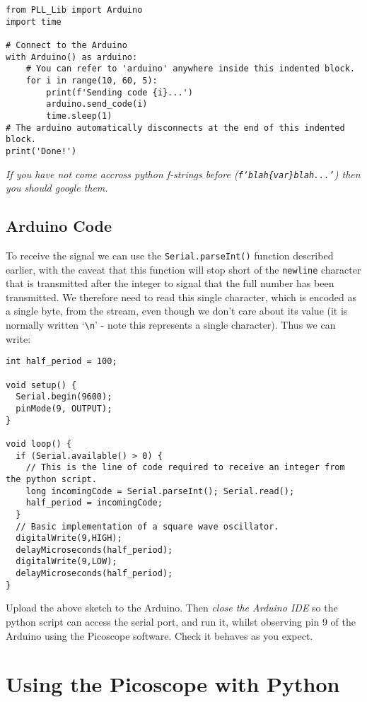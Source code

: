 \documentclass{article}
\begin{document}
\begin{verbatim}
from PLL_Lib import Arduino
import time

# Connect to the Arduino
with Arduino() as arduino:
    # You can refer to 'arduino' anywhere inside this indented block.
    for i in range(10, 60, 5):
        print(f'Sending code {i}...')
        arduino.send_code(i)
        time.sleep(1)
# The arduino automatically disconnects at the end of this indented block.
print('Done!')
\end{verbatim}
\textit{If you have not come accross python f-strings before (\texttt{f`blah\{var\}blah...'}) then you should google them.}
\subsection{Arduino Code}\label{sec:ard_code}
To receive the signal we can use the \texttt{Serial.parseInt()} function described earlier, with the caveat that this function will stop short of the \texttt{newline} character that is transmitted after the integer to signal that the full number has been transmitted. We therefore need to read this single character, which is encoded as a single byte, from the stream, even though we don't care about its value (it is normally written `\texttt{\textbackslash n}' - note this represents a single character). Thus we can write:

\begin{verbatim}
int half_period = 100;

void setup() {
  Serial.begin(9600);
  pinMode(9, OUTPUT);
}

void loop() {
  if (Serial.available() > 0) {
    // This is the line of code required to receive an integer from the python script.
    long incomingCode = Serial.parseInt(); Serial.read();
    half_period = incomingCode;
  }
  // Basic implementation of a square wave oscillator.
  digitalWrite(9,HIGH);
  delayMicroseconds(half_period);
  digitalWrite(9,LOW);
  delayMicroseconds(half_period);
}
\end{verbatim}

Upload the above sketch to the Arduino. Then \textit{close the Arduino IDE} so the python script can access the serial port, and run it, whilst observing pin 9 of the Arduino using the Picoscope software. Check it behaves as you expect.

\section{Using the Picoscope with Python}
\end{document}
